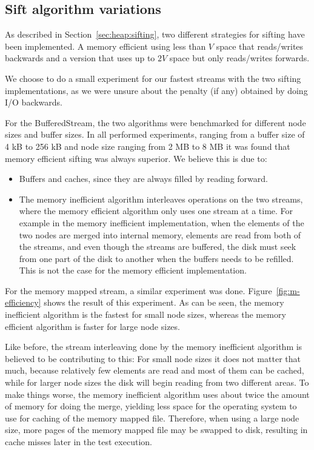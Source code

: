 
\subsection{Sift algorithm variations}
\label{sec:sifting}
As described in Section~\ref{sec:heap:sifting}, two different strategies for sifting have been implemented. A memory efficient using less than $V$ space that reads/writes backwards and a version that uses up to $2V$ space but only reads/writes forwards.

We choose to do a small experiment for our fastest streams with the two sifting implementations, as we were unsure about the penalty (if any) obtained by doing I/O backwards.

For the BufferedStream, the two algorithms were benchmarked for different node sizes and buffer sizes. In all performed experiments, ranging from a buffer size of 4 kB to 256 kB and node size ranging from 2 MB to 8 MB it was found that memory efficient sifting was always superior. We believe this is due to:

\begin{itemize}
\item Buffers and caches, since they are always filled by reading forward.
\item The memory inefficient algorithm interleaves operations on the two streams, where the memory efficient algorithm only uses one stream at a time. For example in the memory inefficient implementation, when the elements of the two nodes are merged into internal memory, elements are read from both of the streams, and even though the streams are buffered, the disk must seek from one part of the disk to another when the buffers needs to be refilled. This is not the case for the memory efficient implementation.
\end{itemize}

For the memory mapped stream, a similar experiment was done. Figure~\ref{fig:m-efficiency} shows the result of this experiment. As can be seen, the memory inefficient algorithm is the fastest for small node sizes, whereas the memory efficient algorithm is faster for large node sizes.

Like before, the stream interleaving done by the memory inefficient algorithm is believed to be contributing to this: For small node sizes it does not matter that much, because relatively few elements are read and most of them can be cached, while for larger node sizes the disk will begin reading from two different areas. To make things worse, the memory inefficient algorithm uses about twice the amount of memory for doing the merge, yielding less space for the operating system to use for caching of the memory mapped file. Therefore, when using a large node size, more pages of the memory mapped file may be swapped to disk, resulting in cache misses later in the test execution.

